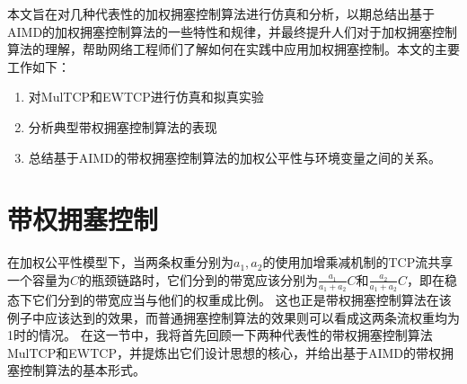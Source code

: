 \documentclass[winfonts]{njuthesis}
\begin{document}
本文旨在对几种代表性的加权拥塞控制算法进行仿真和分析，以期总结出基于AIMD的加权拥塞控制算法的一些特性和规律，并最终提升人们对于加权拥塞控制算法的理解，帮助网络工程师们了解如何在实践中应用加权拥塞控制。本文的主要工作如下：
\begin{enumerate}
\item 对MulTCP和EWTCP进行仿真和拟真实验

\item 分析典型带权拥塞控制算法的表现

\item 总结基于AIMD的带权拥塞控制算法的加权公平性与环境变量之间的关系。
\end{enumerate}



\chapter{带权拥塞控制}\label{chapter:wcc}

在加权公平性模型下，当两条权重分别为$a_1, a_2$的使用加增乘减机制的TCP流共享一个容量为$C$的瓶颈链路时，它们分到的带宽应该分别为$\frac{a_1}{a_1 + a_2}C$和$\frac{a_2}{a_1 + a_2}C$，即在稳态下它们分到的带宽应当与他们的权重成比例。
这也正是带权拥塞控制算法在该例子中应该达到的效果，而普通拥塞控制算法的效果则可以看成这两条流权重均为1时的情况。
在这一节中，我将首先回顾一下两种代表性的带权拥塞控制算法MulTCP\cite{crowcroft1998differentiated}和EWTCP\cite{wischik2011design}，并提炼出它们设计思想的核心，并给出基于AIMD的带权拥塞控制算法的基本形式。
\end{document}
